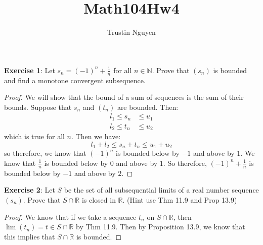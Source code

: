 \documentclass{article}
\title{Math104Hw4}
\author{Trustin Nguyen}
\begin{document}
    \maketitle

\reversemarginpar

\textbf{Exercise 1}: Let $s_{n} = (-1)^{n} + \frac{1}{n}$ for all $n \in \mathbb{N}$. Prove that $(s_{n})$ is bounded and find a monotone convergent subsequence.
    \begin{proof}
        We will show that the bound of a sum of sequences is the sum of their bounds. Suppose that $s_{n}$ and $(t_{n})$ are bounded. Then:
            \begin{align*}
                l_{1} \leq s_{n} &\leq u_{1} \\
                l_{2} \leq t_{n} &\leq u_{2}
            \end{align*}
        which is true for all $n$. Then we have:
            \begin{equation*}
                l_{1} + l_{2} \leq s_{n} + t_{n} \leq u_{1} + u_{2}
            \end{equation*}
        so therefore, we know that $(-1)^{n}$ is bounded below by $-1$ and above by $1$. We know that $\frac{1}{n}$ is bounded below by $0$ and above by $1$. So therefore, $(-1)^{n} + \frac{1}{n}$ is bounded below by $-1$ and above by $2$.
    \end{proof}

\textbf{Exercise 2}: Let $S$ be the set of all subsequential limits of a real number sequence $(s_{n})$. Prove that $S \cap \mathbb{R}$ is closed in $\mathbb{R}$. (Hint use Thm 11.9 and Prop 13.9)
    \begin{proof}
        We know that if we take a sequence $t_{n}$ on $S \cap \mathbb{R}$, then $\lim(t_{n}) = t \in S \cap \mathbb{R}$ by Thm 11.9. Then by Proposition 13.9, we know that this implies that $S \cap \mathbb{R}$ is bounded.
    \end{proof}
\end{document}
